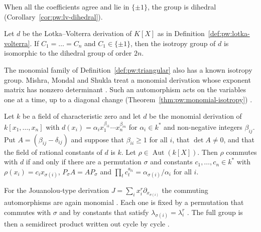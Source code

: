 When all the coefficients agree and lie in $\{\pm1\}$, the group is dihedral (Corollary~\ref{cor:pw:lv-dihedral}).

\begin{corollary}\label{cor:pw:lv-dihedral}
Let $d$ be the Lotka--Volterra derivation of $K[X]$ as in
Definition~\ref{def:pw:lotka-volterra}. If $C_{1}=\dots=C_{n}$ and
$C_{1}\in\{\pm 1\}$, then the isotropy group of $d$ is isomorphic to the
dihedral group of order $2n$.
\end{corollary}

The monomial family of Definition~\ref{def:pw:triangular} also has a known
isotropy group. Mishra, Mondal and Shukla treat a monomial derivation whose
exponent matrix has nonzero determinant
\cite[Theorem~3.1, p.~5]{MishraMondalShukla2026Monomial}. Such an
automorphism acts on the variables one at a time, up to a diagonal change (Theorem~\ref{thm:pw:monomial-isotropy})
\cite[Theorem~3.1, p.~5]{MishraMondalShukla2026Monomial}.\begin{theorem}\label{thm:pw:monomial-isotropy}
Let $k$ be a field of characteristic zero and let $d$ be the monomial
derivation of $k[x_{1},\dots,x_{n}]$ with $d(x_{i})=\alpha_{i}x_{1}^{\beta_{i1}}\cdots x_{n}^{\beta_{in}}$
for $\alpha_{i}\in k^{*}$ and non-negative integers $\beta_{ij}$. Put
$A=(\beta_{ij}-\delta_{ij})$ and suppose that $\beta_{ii}\geq 1$ for all
$i$, that $\det A\neq 0$, and that the field of rational constants of $d$ is
$k$. Let $\rho\in\operatorname{Aut}(k[X])$. Then $\rho$ commutes with $d$ if
and only if there are a permutation $\sigma$ and constants $c_{1},\dots,c_{n}\in k^{*}$
with $\rho(x_{i})=c_{i}x_{\sigma(i)}$, $P_{\sigma}A=AP_{\sigma}$ and
$\prod_{t}c_{t}^{a_{ti}}=\alpha_{\sigma(i)}/\alpha_{i}$ for all $i$.
\end{theorem}

For the Jouanolou-type derivation $J=\sum_{i}x_{i}^{r}\partial_{x_{\sigma(i)}}$
the commuting automorphisms are again monomial
\cite[Theorem~4.2, p.~11]{MishraMondalShukla2026Monomial}. Each one is fixed
by a permutation that commutes with $\sigma$ and by constants that satisfy
$\lambda_{\sigma(i)}=\lambda_{i}^{r}$ \cite[Theorem~4.2, p.~11]{MishraMondalShukla2026Monomial}.
The full group is then a semidirect product written out cycle by cycle
\cite[Theorem~4.6, p.~14]{MishraMondalShukla2026Monomial}.

